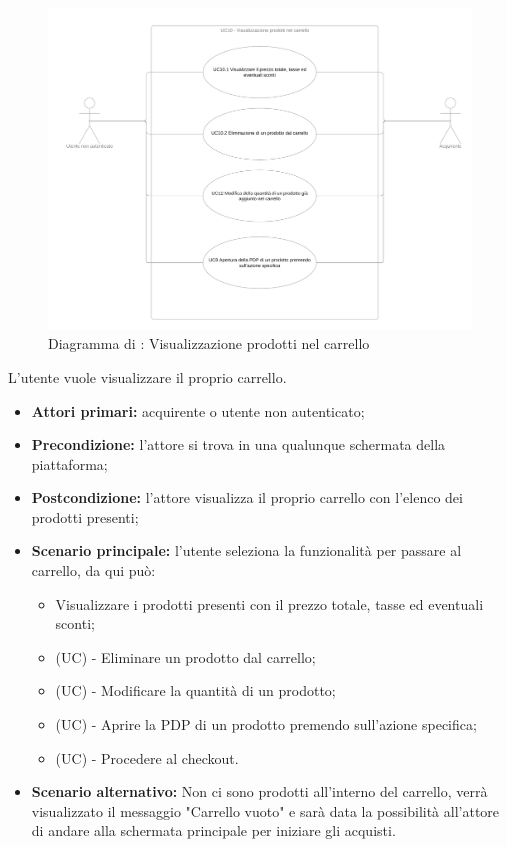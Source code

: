 
\begin{figure}[H]
    \centering
    \includegraphics[width=\textwidth]{Immagini/DiagrammiUC/UC10VisualizzazioneProdottiNelCarrello.png}
    \caption{Diagramma di \actualUC: Visualizzazione prodotti nel carrello} 
    \label{fig:VisualizzazioneProdottiNelCarrello}
\end{figure}
L'utente vuole visualizzare il proprio carrello.
\begin{itemize}
    \item \textbf{Attori primari:} acquirente o utente non autenticato;
    \item \textbf{Precondizione:} l'attore si trova in una qualunque schermata della piattaforma;
    \item \textbf{Postcondizione:} l'attore visualizza il proprio carrello con l'elenco dei prodotti presenti;
    \item \textbf{Scenario principale:} l'utente seleziona la funzionalità per passare al carrello, da qui può:
    \begin{itemize}
        \item Visualizzare i prodotti presenti con il prezzo totale, tasse ed eventuali sconti;
        \item (UC) - Eliminare un prodotto dal carrello;
        \item (UC) - Modificare la quantità di un prodotto;
        \item (UC) - Aprire la PDP di un prodotto premendo sull'azione specifica;
        \item (UC) - Procedere al checkout.
    \end{itemize}
    \item \textbf{Scenario alternativo:} Non ci sono prodotti all'interno del carrello, verrà visualizzato il messaggio "Carrello vuoto" e sarà data la possibilità all'attore di andare alla schermata principale per iniziare gli acquisti.
\end{itemize}

